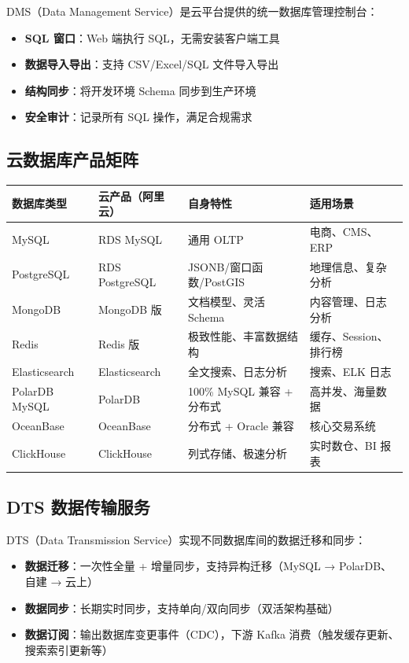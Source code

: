 \documentclass[12pt,UTF8]{ctexbook}
\begin{document}
DMS（Data Management Service）是云平台提供的统一数据库管理控制台：

\begin{itemize}
    \item \textbf{SQL 窗口}：Web 端执行 SQL，无需安装客户端工具
    \item \textbf{数据导入导出}：支持 CSV/Excel/SQL 文件导入导出
    \item \textbf{结构同步}：将开发环境 Schema 同步到生产环境
    \item \textbf{安全审计}：记录所有 SQL 操作，满足合规需求
\end{itemize}

\subsection*{云数据库产品矩阵}

\begin{tabular}{|p{2.5cm}|p{2.5cm}|p{4cm}|p{3.5cm}|}
\hline
\textbf{数据库类型} & \textbf{云产品（阿里云）} & \textbf{自身特性} & \textbf{适用场景} \\
\hline
MySQL & RDS MySQL & 通用 OLTP & 电商、CMS、ERP \\
\hline
PostgreSQL & RDS PostgreSQL & JSONB/窗口函数/PostGIS & 地理信息、复杂分析 \\
\hline
MongoDB & MongoDB 版 & 文档模型、灵活 Schema & 内容管理、日志分析 \\
\hline
Redis & Redis 版 & 极致性能、丰富数据结构 & 缓存、Session、排行榜 \\
\hline
Elasticsearch & Elasticsearch & 全文搜索、日志分析 & 搜索、ELK 日志 \\
\hline
PolarDB MySQL & PolarDB & 100\% MySQL 兼容 + 分布式 & 高并发、海量数据 \\
\hline
OceanBase & OceanBase & 分布式 + Oracle 兼容 & 核心交易系统 \\
\hline
ClickHouse & ClickHouse & 列式存储、极速分析 & 实时数仓、BI 报表 \\
\hline
\end{tabular}

\subsection*{DTS 数据传输服务}

DTS（Data Transmission Service）实现不同数据库间的数据迁移和同步：
\begin{itemize}
    \item \textbf{数据迁移}：一次性全量 + 增量同步，支持异构迁移（MySQL → PolarDB、自建 → 云上）
    \item \textbf{数据同步}：长期实时同步，支持单向/双向同步（双活架构基础）
    \item \textbf{数据订阅}：输出数据库变更事件（CDC），下游 Kafka 消费（触发缓存更新、搜索索引更新等）
\end{itemize}
\end{document}
